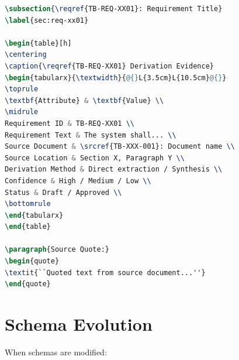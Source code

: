 \documentclass[11pt,a4paper,twoside]{report}
\newcommand{\srcref}[1]{\texttt{#1}}
\newcommand{\reqref}[1]{\texttt{#1}}
\begin{document}
\begin{lstlisting}[language=tex,basicstyle=\ttfamily\small]
\subsection{\reqref{TB-REQ-XX01}: Requirement Title}
\label{sec:req-xx01}

\begin{table}[h]
\centering
\caption{\reqref{TB-REQ-XX01} Derivation Evidence}
\begin{tabularx}{\textwidth}{@{}L{3.5cm}L{10.5cm}@{}}
\toprule
\textbf{Attribute} & \textbf{Value} \\
\midrule
Requirement ID & TB-REQ-XX01 \\
Requirement Text & The system shall... \\
Source Document & \srcref{TB-XXX-001}: Document name \\
Source Location & Section X, Paragraph Y \\
Derivation Method & Direct extraction / Synthesis \\
Confidence & High / Medium / Low \\
Status & Draft / Approved \\
\bottomrule
\end{tabularx}
\end{table}

\paragraph{Source Quote:}
\begin{quote}
\textit{``Quoted text from source document...''}
\end{quote}
\end{lstlisting}

\section{Schema Evolution}
\label{sec:schema-evolution}

When schemas are modified:
\end{document}
